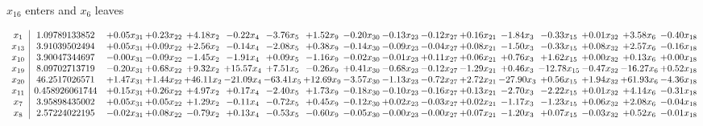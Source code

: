 \documentclass[9pt]{article}
\begin{document}
 $ x_{16} $ enters and $ x_{6} $ leaves 

 \[\begin{array}{c| c c@{\hskip 2pt} c@{\hskip 2pt} c@{\hskip 2pt} c@{\hskip 2pt} c@{\hskip 2pt} c@{\hskip 2pt} c@{\hskip 2pt} c@{\hskip 2pt} c@{\hskip 2pt} c@{\hskip 2pt} c@{\hskip 2pt} c@{\hskip 2pt} c@{\hskip 2pt} c@{\hskip 2pt} c@{\hskip 2pt} }
 x_{1}   &  1.09789133852 & +  0.05 x_{31} & +  0.23 x_{22} & +  4.18 x_{2} & -0.22 x_{4} & -3.76 x_{5} & +  1.52 x_{9} & -0.20 x_{30} & -0.13 x_{23} & -0.12 x_{27} & +  0.16 x_{21} & -1.84 x_{3} & -0.33 x_{15} & +  0.01 x_{32} & +  3.58 x_{6} & -0.40 x_{18}\\
 x_{13}   &  3.91039502494 & +  0.05 x_{31} & +  0.09 x_{22} & +  2.56 x_{2} & -0.14 x_{4} & -2.08 x_{5} & +  0.38 x_{9} & -0.14 x_{30} & -0.09 x_{23} & -0.04 x_{27} & +  0.08 x_{21} & -1.50 x_{3} & -0.33 x_{15} & +  0.08 x_{32} & +  2.57 x_{6} & -0.16 x_{18}\\
 x_{10}   &  3.90047344697 & -0.00 x_{31} & -0.09 x_{22} & -1.45 x_{2} & -1.91 x_{4} & +  0.09 x_{5} & -1.16 x_{9} & -0.02 x_{30} & -0.01 x_{23} & +  0.11 x_{27} & +  0.06 x_{21} & +  0.76 x_{3} & +  1.62 x_{15} & +  0.00 x_{32} & +  0.13 x_{6} & +  0.00 x_{18}\\
 x_{19}   &  8.09702713719 & -0.20 x_{31} & +  0.68 x_{22} & +  9.32 x_{2} & + 15.57 x_{4} & +  7.51 x_{5} & -0.26 x_{9} & +  0.41 x_{30} & -0.68 x_{23} & -0.12 x_{27} & -1.29 x_{21} & +  0.46 x_{3} & -12.78 x_{15} & -0.47 x_{32} & -16.27 x_{6} & +  0.52 x_{18}\\
 x_{20}   &  46.2517026571 & +  1.47 x_{31} & +  1.44 x_{22} & + 46.11 x_{2} & -21.09 x_{4} & -63.41 x_{5} & + 12.69 x_{9} & -3.57 x_{30} & -1.13 x_{23} & -0.72 x_{27} & +  2.72 x_{21} & -27.90 x_{3} & +  0.56 x_{15} & +  1.94 x_{32} & + 61.93 x_{6} & -4.36 x_{18}\\
 x_{11}   &  0.458926061744 & +  0.15 x_{31} & +  0.26 x_{22} & +  4.97 x_{2} & +  0.17 x_{4} & -2.40 x_{5} & +  1.73 x_{9} & -0.18 x_{30} & -0.10 x_{23} & -0.16 x_{27} & +  0.13 x_{21} & -2.70 x_{3} & -2.22 x_{15} & +  0.01 x_{32} & +  4.14 x_{6} & -0.31 x_{18}\\
 x_{7}   &  3.95898435002 & +  0.05 x_{31} & +  0.05 x_{22} & +  1.29 x_{2} & -0.11 x_{4} & -0.72 x_{5} & +  0.45 x_{9} & -0.12 x_{30} & +  0.02 x_{23} & -0.03 x_{27} & +  0.02 x_{21} & -1.17 x_{3} & -1.23 x_{15} & +  0.06 x_{32} & +  2.08 x_{6} & -0.04 x_{18}\\
 x_{8}   &  2.57224022195 & -0.02 x_{31} & +  0.08 x_{22} & -0.79 x_{2} & +  0.13 x_{4} & -0.53 x_{5} & -0.60 x_{9} & -0.05 x_{30} & -0.00 x_{23} & -0.00 x_{27} & +  0.07 x_{21} & -1.20 x_{3} & +  0.07 x_{15} & -0.03 x_{32} & +  0.52 x_{6} & -0.01 x_{18}\\

\end{array}\]
\end{document}
